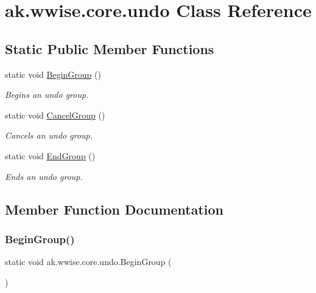 \hypertarget{classak_1_1wwise_1_1core_1_1undo}{}\section{ak.\+wwise.\+core.\+undo Class Reference}
\label{classak_1_1wwise_1_1core_1_1undo}
\subsection*{Static Public Member Functions}
\begin{DoxyCompactItemize}
\item 
static void \mbox{\hyperlink{classak_1_1wwise_1_1core_1_1undo_aaaac1e2ad546cb143f2791359d73ef4b}{Begin\+Group}} ()
\begin{DoxyCompactList}\small\item\em Begins an undo group. \end{DoxyCompactList}\item 
static void \mbox{\hyperlink{classak_1_1wwise_1_1core_1_1undo_afe129a0834826920097efa39c0d5fb2e}{Cancel\+Group}} ()
\begin{DoxyCompactList}\small\item\em Cancels an undo group. \end{DoxyCompactList}\item 
static void \mbox{\hyperlink{classak_1_1wwise_1_1core_1_1undo_ae7cdf90c5b5668d13b74e5b37d81cea6}{End\+Group}} ()
\begin{DoxyCompactList}\small\item\em Ends an undo group. \end{DoxyCompactList}\end{DoxyCompactItemize}


\subsection{Member Function Documentation}
\mbox{\label{classak_1_1wwise_1_1core_1_1undo_aaaac1e2ad546cb143f2791359d73ef4b}} 
\subsubsection{\texorpdfstring{Begin\+Group()}{BeginGroup()}}
{\footnotesize\ttfamily static void ak.\+wwise.\+core.\+undo.\+Begin\+Group (\begin{DoxyParamCaption}{ }\end{DoxyParamCaption})\hspace{0.3cm}{\ttfamily [static]}}



